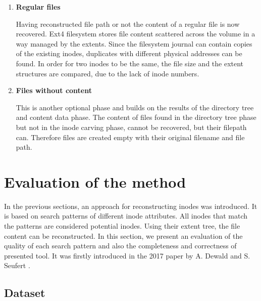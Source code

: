 \documentclass{acm_proc_article-sp}
\begin{document}
\begin{enumerate}
\item \textbf{Regular files}

Having reconstructed file path or not the content of a regular file is now recovered. Ext4 filesystem stores file content scattered across the volume in a way managed by the extents. Since the filesystem journal can contain copies of the existing inodes, duplicates with different physical addresses can be found. In order for two inodes to be the same, the file size and the extent structures are compared, due to the lack of inode numbers.
\item \textbf{Files without content}

This is another optional phase and builds on the results of the directory tree and content data phase. The content of files found in the directory tree phase but not in the inode carving phase, cannot be recovered, but their filepath can. Therefore files are created empty with their original filename and file path.
\end{enumerate}

\section{Evaluation of the method}

In the previous sections, an approach for reconstructing inodes was introduced. It is based on search patterns of different inode attributes. All inodes that match the patterns are considered potential inodes. Using their extent tree, the file content can be reconstructed. In this section, we present an evaluation of the quality of each search pattern and also the completeness and correctness of presented tool. It was firstly introduced in the 2017 paper by A. Dewald and S. Seufert \cite{afeic}.

\subsection{Dataset}
\end{document}

